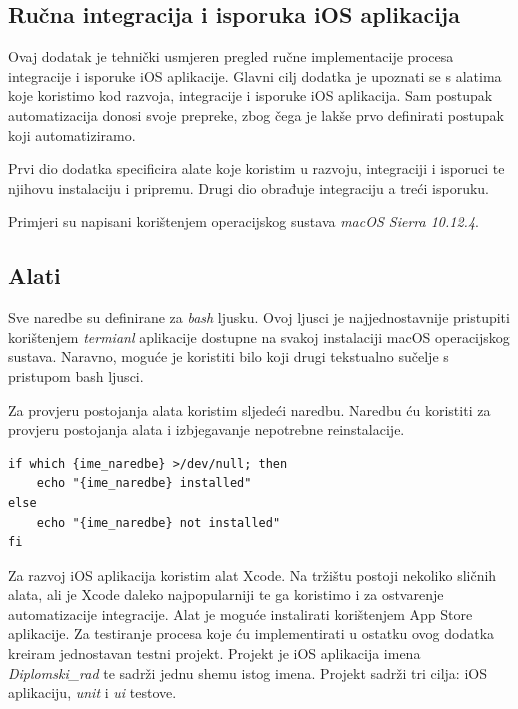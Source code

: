 \documentclass[times, utf8, diplomski, numeric]{fer}
\begin{document}
\begin{appendices}



\chapter{Ručna integracija i isporuka iOS aplikacija}

Ovaj dodatak je tehnički usmjeren pregled ručne implementacije procesa integracije i isporuke iOS aplikacije. Glavni cilj dodatka je upoznati se s alatima koje koristimo kod razvoja, integracije i isporuke iOS aplikacija. Sam postupak automatizacija donosi svoje prepreke, zbog čega je lakše prvo definirati postupak koji automatiziramo.

Prvi dio dodatka specificira alate koje koristim u razvoju, integraciji i isporuci te njihovu instalaciju i pripremu. Drugi dio obrađuje integraciju a treći isporuku.

Primjeri su napisani korištenjem operacijskog sustava \textit{macOS Sierra 10.12.4}.

\section{Alati}

Sve naredbe su definirane za \textit{bash} ljusku. Ovoj ljusci je najjednostavnije pristupiti korištenjem \textit{termianl} aplikacije dostupne na svakoj instalaciji macOS operacijskog sustava. Naravno, moguće je koristiti bilo koji drugi tekstualno sučelje s pristupom bash ljusci.

Za provjeru postojanja alata koristim sljedeći naredbu. Naredbu ću koristiti za provjeru postojanja alata i izbjegavanje nepotrebne reinstalacije.

\begin{verbatim}
if which {ime_naredbe} >/dev/null; then
    echo "{ime_naredbe} installed"
else
    echo "{ime_naredbe} not installed"
fi
\end{verbatim}

Za razvoj iOS aplikacija koristim alat Xcode. Na tržištu postoji nekoliko sličnih alata, ali je Xcode daleko najpopularniji te ga koristimo i za ostvarenje automatizacije integracije. Alat je moguće instalirati korištenjem App Store aplikacije. Za testiranje procesa koje ću implementirati u ostatku ovog dodatka kreiram jednostavan testni projekt. Projekt je iOS aplikacija imena \textit{Diplomski\_rad} te sadrži jednu shemu istog imena. Projekt sadrži tri cilja: iOS aplikaciju, \textit{unit} i \textit{ui} testove.


\end{appendices}
\end{document}
